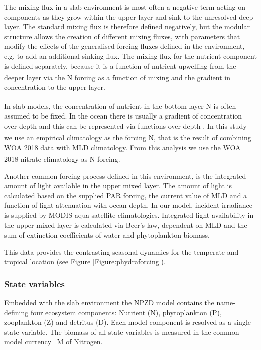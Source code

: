 \documentclass[journal abbreviations, manuscript]{copernicus}
\begin{document}
The mixing flux in a slab environment is most often a negative term acting on components as they grow within the upper layer and sink to the unresolved deep layer. The standard mixing flux is therefore defined negatively, but the modular structure allows the creation of different mixing fluxes, with parameters that modify the effects of the generalised forcing fluxes defined in the environment, e.g. to add an additional sinking flux. The mixing flux for the nutrient component is defined separately, because it is a function of nutrient upwelling from the deeper layer via the \unit{N^\emptyset} forcing as a function of mixing and the gradient in concentration to the upper layer.

In slab models, the concentration of nutrient in the bottom layer \unit{N^\emptyset} is often assumed to be fixed. In the ocean there is usually a gradient of concentration over depth and this can be represented via functions over depth \citep{Frost1987GrazingSpp., Fasham1995VariationsAnalysis}. In this study we use an empirical climatology as the forcing \unit{N^\emptyset}, that is the result of combining WOA 2018 data with MLD climatology. From this analysis we use the WOA 2018 nitrate climatology as \unit{N^\emptyset} forcing.

Another common forcing process defined in this environment, is the integrated amount of light available in the upper mixed layer. The amount of light is calculated based on the supplied PAR forcing, the current value of MLD and a function of light attenuation with ocean depth. In our model, incident irradiance is supplied by MODIS-aqua satellite climatologies. Integrated light availability in the upper mixed layer is calculated via Beer's law, dependent on MLD and the sum of extinction coefficients of water and phytoplankton biomass. 

This data provides the contrasting seasonal dynamics for the temperate and tropical location (see Figure \ref{Figure:phydraforcing}).

\subsubsection{State variables}
Embedded with the slab environment the NPZD model contains the name-defining four ecosystem components: Nutrient (N), phytoplankton (P), zooplankton (Z) and detritus (D). 
Each model component is resolved as a single state variable. The biomass of all state variables is measured in the common model currency \unit{\mu M} of Nitrogen.
\end{document}
